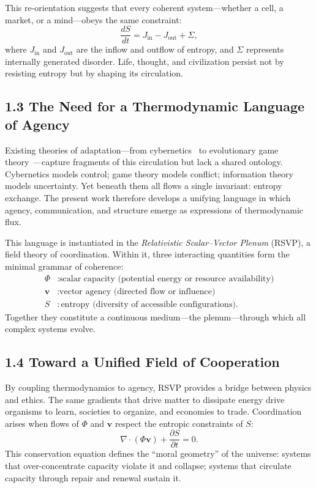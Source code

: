 \documentclass[11pt,a4paper,titlepage]{article}
\theoremstyle{definition}
\begin{document}
This re-orientation suggests that every coherent system—whether a cell,
a market, or a mind—obeys the same constraint:
\begin{equation}
\frac{dS}{dt} = J_{\text{in}} - J_{\text{out}} + \Sigma,
\label{eq:entropy_balance_intro}
\end{equation}
where $J_{\text{in}}$ and $J_{\text{out}}$ are the inflow and outflow of entropy,
and $\Sigma$ represents internally generated disorder.
Life, thought, and civilization persist not by resisting entropy but by shaping
its circulation.

\subsection{1.3 The Need for a Thermodynamic Language of Agency}

Existing theories of adaptation---from cybernetics~\cite{wiener1948,ashby1956}
to evolutionary game theory~\cite{smith1973,hofbauer1998}---capture fragments of
this circulation but lack a shared ontology.
Cybernetics models control; game theory models conflict;
information theory models uncertainty.
Yet beneath them all flows a single invariant: entropy exchange.
The present work therefore develops a unifying language in which
agency, communication, and structure emerge as expressions of thermodynamic flux.

This language is instantiated in the
\emph{Relativistic Scalar--Vector Plenum} (RSVP),
a field theory of coordination.
Within it, three interacting quantities form the minimal grammar of coherence:
\begin{align}
\Phi &: \text{scalar capacity (potential energy or resource availability)} \nonumber \\
\mathbf{v} &: \text{vector agency (directed flow or influence)} \nonumber \\
S &: \text{entropy (diversity of accessible configurations)}. \nonumber
\end{align}
Together they constitute a continuous medium—the plenum—through which
all complex systems evolve.

\subsection{1.4 Toward a Unified Field of Cooperation}

By coupling thermodynamics to agency,  
RSVP provides a bridge between physics and ethics.
The same gradients that drive matter to dissipate energy
drive organisms to learn, societies to organize, and economies to trade.
Coordination arises when flows of $\Phi$ and $\mathbf{v}$
respect the entropic constraints of $S$:
\begin{equation}
\nabla \cdot (\Phi \mathbf{v}) + \frac{\partial S}{\partial t} = 0.
\label{eq:continuity_intro}
\end{equation}
This conservation equation defines the “moral geometry” of the universe:
systems that over-concentrate capacity violate it and collapse;
systems that circulate capacity through repair and renewal sustain it.
\end{document}
